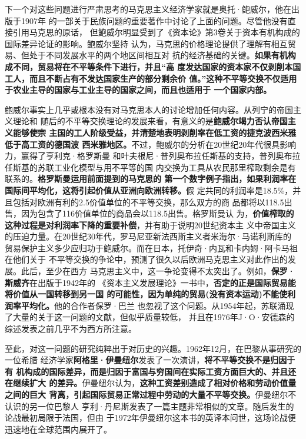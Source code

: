 下一个对这些问题进行严肃思考的马克思主义经济学家就是奥托·鲍威尔，他在出版于1907年
的一部关于民族问题的重要著作中讨论了上面的问题。尽管他没有直接引用马克思的原话，
但鲍威尔明显受到了《资本论》第3卷关于资本有机构成的国际差异论证的影响。鲍威尔坚持
认为，马克思的价格理论提供了理解有相互贸易、但处于不同发展水平的两个地区间相互对
抗的经济基础的关键。\textbf{如果有机构成不同，贸易将在不平等条件下进行，并且“高
  度发达国家的资本家不仅剥削本国工人，而且不断占有不发达国家生产的部分剩余价
  值。”这种不平等交换不仅适用于农业主导的国家与工业主导的国家之间，而且也适用于
  一个国家内部。}

鲍威尔事实上几乎或根本没有对马克思本人的讨论增加任何内容。从列宁的帝国主义理论和
随后的不平等交换理论的发展来看，有意义的是\textbf{鲍威尔竭力否认帝国主义能够使宗
  主国的工人阶级受益，并清楚地表明剥削率在低工资的捷克波西米雅低于高工资的德国波
  西米雅地区。}不过，鲍威尔的分析在20世纪20年代很具影响力，赢得了亨利克·格罗斯曼
和叶夫根尼·普列奥布拉任斯基的支持，普列奥布拉任斯基的苏联工业化模型与用不平等的国
内交换为工具从农民那里榨取剩余是有联系的。\textbf{格罗斯曼运用前面提到的马克思的
  第一个数字例子指出，如果利润率在国际间平均化，这将引起价值从亚洲向欧洲转移。}假
定共同的利润率是18.5\%，并且包括对欧洲有利的2.5价值单位的不平等交换，那么双方的商
品都将以118.5出售，因为包含了116价值单位的商品会以118.5出售。格罗斯曼认
为，\textbf{价值榨取的这种过程是对利润率下降的重要补偿}，并有助于说明20世纪资本主
义中帝国主义的压迫力量。在20世纪30年代，罗马尼亚新法西斯主义者米海尔·马诺利斯库的
贸易保护主义多少应归功于鲍威尔。而在日本，托伊奇·内瓦和卡内姆·阿卡马祖在他们关于
不平等交换的争论中，预测了很久以后欧洲马克思主义对此作出的发展。此后，至少在西方
马克思主义中，这一争论变得不太突出了。例如，\textbf{保罗·斯威齐}在出版于1942年的
《资本主义发展理论》一书中，\textbf{否定的正是国际贸易能将价值从一国转移到另一国
  的可能性，因为单纯的贸易(没有资本运动)不能使利润率平均化。}他的合作者保罗·巴兰
也忽视了这个问题。从1954年起，苏联涌现了大量的关于这一问题的文献，但似乎质量较低，
并且在1976年J·O·安德森的综述发表之前几乎不为西方所注意。

至此，对这一问题的研究纯粹出于对历史的兴趣。1962年12月，在巴黎从事研究的一位希腊
经济学家\textbf{阿格里·伊曼纽尔}发表了一次演讲，\textbf{将不平等交换不是归因于有
  机构成的国际差异，而是归因于富国与穷国间在实际工资方面巨大的、并且还在继续扩大
  的差异。}伊曼纽尔认为，\textbf{这种工资差别造成了相对价格和劳动价值量之间的巨大
  背离，引起国际贸易正常过程中劳动的大量不平等交换。}伊曼纽尔不认识的另一位巴黎人
亨利·丹尼斯发表了一篇主题非常相似的文章。随后发生的论战最初局限于法国，但由
于1972年伊曼纽尔这本书的英译本问世，这场论战便迅速地在全球范围内展开了。


